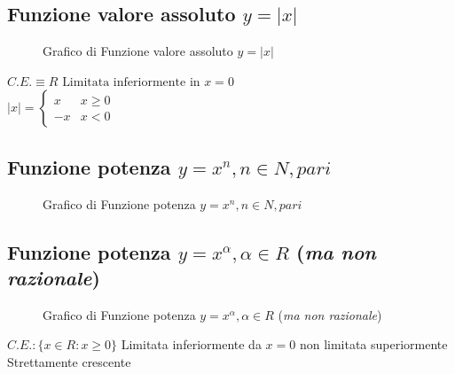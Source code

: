 \subsection{Funzione valore assoluto $y=|x|$}
\begin{figure}[!ht]
	\centering
	\caption{Grafico di Funzione valore assoluto $y=|x|$}
\end{figure}
$C.E. \equiv R\text{ Limitata inferiormente in } x=0$\\
$|x|=\begin{cases}
	x&x\geq0\\
	-x& x<0
\end{cases}$
\subsection{Funzione potenza $y=x^n,n\in N, pari$}
\begin{figure}[!ht]
	\centering
	\caption{Grafico di Funzione potenza $y=x^n,n\in N, pari$}
\end{figure}\newpage
\subsection{Funzione potenza $y=x^\alpha,\alpha \in R$ (\textit{ma non
razionale})}
\begin{figure}[!ht]
	\centering
	\caption{Grafico di Funzione potenza $y=x^\alpha,\alpha \in R$ (\textit{ma non
razionale})}
\end{figure}
$C.E.:\{x\in R: x\geq 0\}$ Limitata inferiormente da $x=0$ non limitata
superiormente Strettamente crescente
